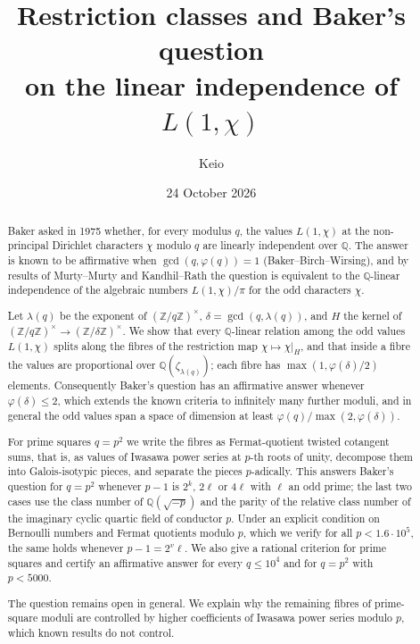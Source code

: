 \documentclass[11pt]{amsart}
\theoremstyle{definition}
\theoremstyle{remark}
\providecommand{\Q}{\mathbb Q}
\providecommand{\Z}{\mathbb Z}
\numberwithin{equation}{section}
\begin{document}
\title[Restriction classes and Baker's question]{Restriction classes and Baker's question\\ on the linear independence of $L(1,\chi)$}
\author{Keio}
\date{24 October 2026}

\begin{abstract}
Baker asked in 1975 whether, for every modulus $q$, the values $L(1,\chi)$ at the non-principal Dirichlet characters $\chi$ modulo $q$ are linearly independent over $\Q$.
The answer is known to be affirmative when $\gcd(q,\varphi(q))=1$ (Baker--Birch--Wirsing), and by results of Murty--Murty and Kandhil--Rath the question is equivalent to the $\Q$-linear independence of the algebraic numbers $L(1,\chi)/\pi$ for the odd characters $\chi$.

Let $\lambda(q)$ be the exponent of $(\Z/q\Z)^\times$, $\delta=\gcd(q,\lambda(q))$, and $H$ the kernel of $(\Z/q\Z)^\times\to(\Z/\delta\Z)^\times$.
We show that every $\Q$-linear relation among the odd values $L(1,\chi)$ splits along the fibres of the restriction map $\chi\mapsto\chi|_H$, and that inside a fibre the values are proportional over $\Q(\zeta_{\lambda(q)})$; each fibre has $\max(1,\varphi(\delta)/2)$ elements.
Consequently Baker's question has an affirmative answer whenever $\varphi(\delta)\le2$, which extends the known criteria to infinitely many further moduli, and in general the odd values span a space of dimension at least $\varphi(q)/\max(2,\varphi(\delta))$.

For prime squares $q=p^2$ we write the fibres as Fermat-quotient twisted cotangent sums, that is, as values of Iwasawa power series at $p$-th roots of unity, decompose them into Galois-isotypic pieces, and separate the pieces $p$-adically.
This answers Baker's question for $q=p^2$ whenever $p-1$ is $2^k$, $2\ell$ or $4\ell$ with $\ell$ an odd prime; the last two cases use the class number of $\Q(\sqrt{-p})$ and the parity of the relative class number of the imaginary cyclic quartic field of conductor $p$.
Under an explicit condition on Bernoulli numbers and Fermat quotients modulo $p$, which we verify for all $p<1.6\cdot10^5$, the same holds whenever $p-1=2^v\ell$.
We also give a rational criterion for prime squares and certify an affirmative answer for every $q\le10^4$ and for $q=p^2$ with $p<5000$.

The question remains open in general.
We explain why the remaining fibres of prime-square moduli are controlled by higher coefficients of Iwasawa power series modulo $p$, which known results do not control.
\end{abstract}
\maketitle
\tableofcontents
\end{document}

